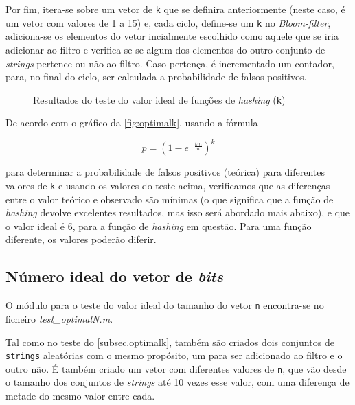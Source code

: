 \documentclass[a4paper,11pt,openright,oneside]{report}
\begin{document}
Por fim, itera-se sobre um vetor de \texttt{k} que se definira anteriormente (neste caso, é um vetor com valores de 1 a 15) e, cada ciclo, define-se um \texttt{k} no \textit{Bloom-filter}, adiciona-se os elementos do vetor incialmente escolhido como aquele que se iria adicionar ao filtro e verifica-se se algum dos elementos do outro conjunto de \textit{strings} pertence ou não ao filtro. Caso pertença, é incrementado um contador, para, no final do ciclo, ser calculada a probabilidade de falsos positivos.

\begin{figure}[ht]	
\center
{}
\caption{Resultados do teste do valor ideal de funções de \textit{hashing} (\texttt{k})}
\label{fig:optimalk}
\end{figure}

De acordo com o gráfico da \autoref{fig:optimalk}, usando a fórmula 

$$ p =  \left(1 - e^{-\frac{km}{n}}\right)^k $$

para determinar a probabilidade de falsos positivos (teórica) para diferentes valores de \texttt{k} e usando os valores do teste acima, verificamos que as diferenças entre o valor teórico e observado são mínimas (o que significa que a função de \textit{hashing} devolve excelentes resultados, mas isso será abordado mais abaixo), e que o valor ideal é 6, para a função de \textit{hashing} em questão. Para uma função diferente, os valores poderão diferir.

\subsection{Número ideal do vetor de \textit{bits}}
\label{subsec.optimaln}

O módulo para o teste do valor ideal do tamanho do vetor \texttt{n} encontra-se no ficheiro \textit{test\_optimalN.m}.

Tal como no teste do \autoref{subsec.optimalk}, também são criados dois conjuntos de \texttt{strings} aleatórias com o mesmo propósito, um para ser adicionado ao filtro e o outro não. É também criado um vetor com diferentes valores de \texttt{n}, que vão desde o tamanho dos conjuntos de \textit{strings} até 10 vezes esse valor, com uma diferença de metade do mesmo valor entre cada.
\end{document}

